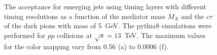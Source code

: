 \begin{figure}
\begin{center}

\end{center}
\caption{
The acceptance for emerging jets using timing layers with different timing resolutions as
a function of the mediator mass $M_X$ and the $c\tau$ of the dark pions with mass of 5~GeV.
The {\sc pythia}8 simulations were performed
for $pp$ collisions at $\sqrt{s}=13$~TeV. The maximum values for 
the color mapping
vary from  0.56 (a)  to  0.0006 (f).  
}
\label{fig:efficiency_med}
\end{figure}

